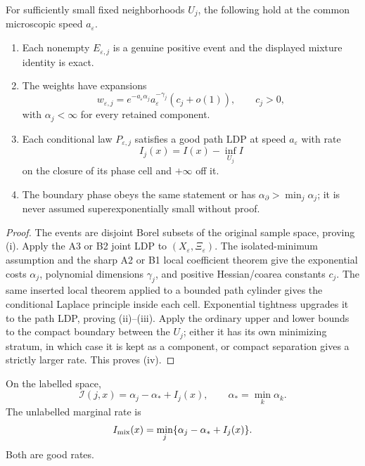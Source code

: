 \begin{theorem}
\label{thm:r21-d1-phases}
For sufficiently small fixed neighborhoods $U_j$, the following hold at the
common microscopic speed $a_\varepsilon$.
\begin{enumerate}[label=(\roman*)]
\item Each nonempty $E_{\varepsilon,j}$ is a genuine positive event and the
      displayed mixture identity is exact.
\item The weights have expansions
\[
 w_{\varepsilon,j}=e^{-a_\varepsilon\alpha_j}
 a_\varepsilon^{-\gamma_j}
 (c_j+o(1)),
 \qquad c_j>0,
\]
with $\alpha_j<\infty$ for every retained component.
\item Each conditional law $P_{\varepsilon,j}$ satisfies a good path LDP at
      speed $a_\varepsilon$ with rate
\[
 I_j(x)=I(x)-\inf_{U_j}I
\]
on the closure of its phase cell and $+\infty$ off it.
\item The boundary phase obeys the same statement or has
$\alpha_\partial>\min_j\alpha_j$; it is never assumed superexponentially small
without proof.
\end{enumerate}
\end{theorem}

\begin{proof}
The events are disjoint Borel subsets of the original sample space, proving
(i).  Apply the A3 or B2 joint LDP to $(X_\varepsilon,\Xi_\varepsilon)$.  The
isolated-minimum assumption and the sharp A2 or B1 local coefficient theorem
give the exponential costs $\alpha_j$, polynomial dimensions $\gamma_j$, and
positive Hessian/coarea constants $c_j$.  The same inserted local theorem
applied to a bounded path cylinder gives the conditional Laplace principle
inside each cell.  Exponential tightness upgrades it to the path LDP, proving
(ii)--(iii).  Apply the ordinary upper and lower bounds to the compact
boundary between the $U_j$; either it has its own minimizing stratum, in which
case it is kept as a component, or compact separation gives a strictly larger
rate.  This proves (iv).
\end{proof}

\begin{theorem}
\label{thm:r21-d1-mixture}
On the labelled space,
\[
 \mathcal I(j,x)=\alpha_j-\alpha_*+I_j(x),
 \qquad \alpha_*=\min_k\alpha_k.
\]
The unlabelled marginal rate is
\[
 I_{\rm mix}(x)=\min_j\{\alpha_j-\alpha_*+I_j(x)\}.
\]
Both are good rates.
\end{theorem}

